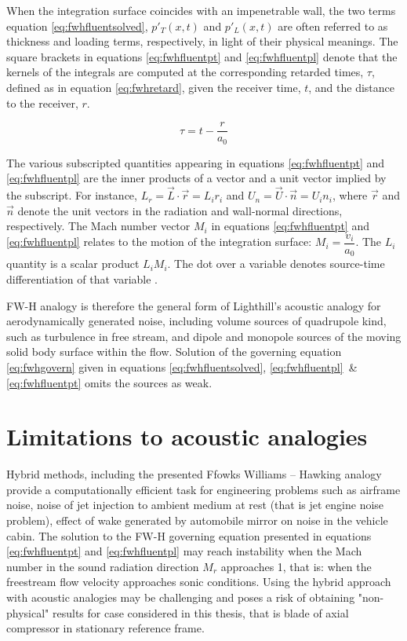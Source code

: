 When the integration surface coincides with an impenetrable wall, the two terms equation \ref{eq:fwhfluentsolved}, $ p'_T(x, t)$ and $p'_L(x, t)$ are often referred to as thickness and loading terms, respectively, in light of their physical meanings. The square brackets in equations \ref{eq:fwhfluentpt} and \ref{eq:fwhfluentpl} denote that the kernels of the integrals are computed at the corresponding retarded times, $\tau$, defined as in equation \ref{eq:fwhretard}, given the receiver time, $t$, and the distance to the receiver, $r$.

\begin{equation} \label{eq:fwhretard}
\tau = t - \frac{r}{a_0}
\end{equation}

The various subscripted quantities appearing in equations \ref{eq:fwhfluentpt} and \ref{eq:fwhfluentpl} are the inner products of a vector and a unit vector implied by the subscript. For instance, $L_r = \vec{L} \cdot \vec{r} = L_i r_i$ and $U_n = \vec{U} \cdot \vec{n} = U_i n_i$, where $\vec{r}$ and $\vec{n}$ denote the unit vectors in the radiation and wall-normal directions, respectively. The Mach number vector $M_i$ in equations \ref{eq:fwhfluentpt} and \ref{eq:fwhfluentpl} relates to the motion of the integration surface: $M_i = \dfrac{v_i}{a_0}$. The $L_i$ quantity is a scalar product $L_i M_i$. The dot over a variable denotes source-time differentiation of that variable \citep{fluenttheory} \citep{FWH} \citep{fwhaiaa}.

FW-H analogy is therefore the general form of Lighthill's acoustic analogy for aerodynamically generated noise, including volume sources of quadrupole kind, such as turbulence in free stream, and dipole and monopole sources of the moving solid body surface within the flow. Solution of the governing equation \ref{eq:fwhgovern} given in equations \ref{eq:fwhfluentsolved}, \ref{eq:fwhfluentpl}~\& \ref{eq:fwhfluentpt} omits the sources as weak. 

\section{Limitations to acoustic analogies}
Hybrid methods, including the presented Ffowks Williams -- Hawking analogy provide a computationally efficient task for engineering problems such as airframe noise, noise of jet injection to ambient medium at rest (that is jet engine noise problem), effect of wake generated by automobile mirror on noise in the vehicle cabin. The solution to the FW-H governing equation presented in equations \ref{eq:fwhfluentpt} and \ref{eq:fwhfluentpl} may reach instability when the Mach number in the sound radiation direction $M_r$ approaches 1, that is: when the freestream flow velocity approaches sonic conditions. Using the hybrid approach with acoustic analogies may be challenging and poses a risk of obtaining "non-physical" results for case considered in this thesis, that is blade of axial compressor in stationary reference frame.

